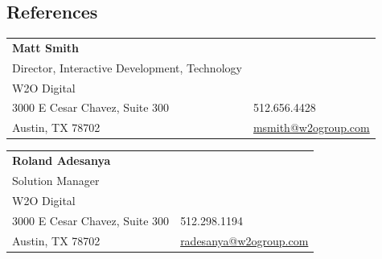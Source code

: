 \documentclass[margin,line]{resume}
\begin{document}
\begin{resume}

\vspace{1em}

\section{\mysidestyle References}

\begin{tabular}{@{}p{9cm}p{3cm}}
\textbf{Matt Smith}\\
Director, Interactive Development, Technology\\
W2O Digital\\
3000 E Cesar Chavez, Suite 300                 &  512.656.4428\\
Austin, TX 78702                     &  \href{mailto:msmith@w2ogroup.com}{msmith@w2ogroup.com}\\
\end{tabular}

\begin{tabular}{@{}p{9cm}p{3cm}}
\textbf{Roland Adesanya}\\
Solution Manager\\
W2O Digital\\
3000 E Cesar Chavez, Suite 300                 &  512.298.1194\\
Austin, TX 78702                     &  \href{mailto:radesanya@w2ogroup.com}{radesanya@w2ogroup.com}\\
\end{tabular}




\end{resume}
\end{document}
